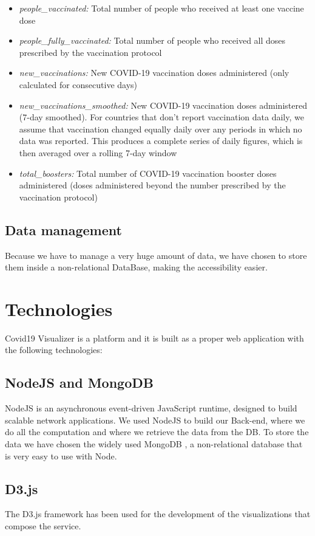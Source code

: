 \documentclass[10pt,conference]{IEEEtran}
\begin{document}
\begin{itemize}
 \item \emph{people\_vaccinated:} Total number of people who received at least one vaccine dose
 \item \emph{people\_fully\_vaccinated:} Total number of people who received all doses prescribed by the vaccination protocol
 \item \emph{new\_vaccinations:} New COVID-19 vaccination doses administered (only calculated for consecutive days)
 \item \emph{new\_vaccinations\_smoothed:} New COVID-19 vaccination doses administered (7-day smoothed). For countries that don't report vaccination data daily, we assume that vaccination changed equally daily over any periods in which no data was reported. This produces a complete series of daily figures, which is then averaged over a rolling 7-day window
 \item \emph{total\_boosters:} Total number of COVID-19 vaccination booster doses administered (doses administered beyond the number prescribed by the vaccination protocol)

 \end{itemize}

\subsection{Data management}
Because we have to manage a very huge amount of data, we have chosen to store them inside a non-relational DataBase, making the accessibility easier.

\section{Technologies}
Covid19 Visualizer is a platform and it is built as a proper web application with the following technologies:

\subsection{NodeJS and MongoDB}
NodeJS is an asynchronous event-driven JavaScript runtime, designed to build scalable network applications.
We used NodeJS \cite{node} to build our Back-end, where we do all the computation and where we retrieve the data from the DB. To store the data we have chosen the widely used
MongoDB \cite{mongo}, a non-relational database that is very easy to use with Node.

\subsection{D3.js}
The D3.js framework \cite{d3} has been used for the development of the visualizations that compose the service.
\end{document}
